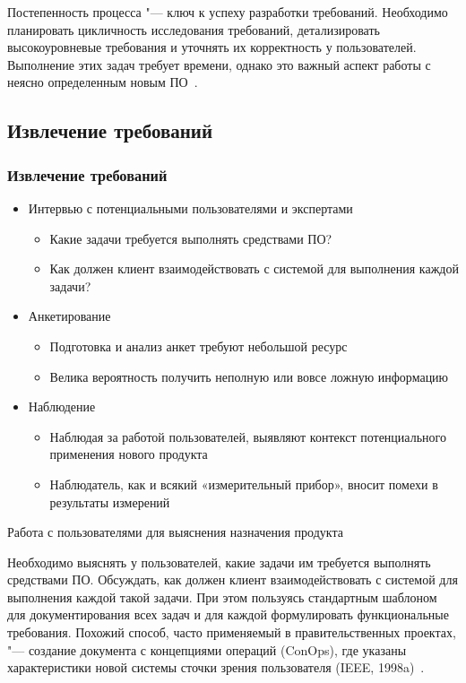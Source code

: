 \documentclass{../industrial-development}
\begin{document}
Постепенность процесса "--- ключ к успеху разработки требований. Необходимо планировать цикличность исследования требований, детализировать высокоуровневые требования и уточнять их корректность у пользователей. Выполнение этих задач требует времени, однако это важный аспект работы с неясно определенным новым ПО~\cite[с.~12--13]{Wiegers}.


\subsection{Извлечение требований}
\begin{frame} \frametitle{Извлечение требований}
\begin{itemize}

\item \alert{Интервью с потенциальными пользователями и экспертами}
\begin{itemize} 
\item Какие задачи требуется выполнять средствами ПО? 
\item Как должен клиент взаимодействовать с
системой для выполнения каждой задачи? 
\end{itemize}

\item \alert{Анкетирование}
\begin{itemize} 
\item Подготовка и анализ анкет требуют небольшой ресурс
\item Велика вероятность получить неполную или вовсе ложную информацию
\end{itemize}

\item \alert{Наблюдение}
\begin{itemize} 
\item Наблюдая за работой пользователей, выявляют контекст потенциального применения нового продукта
\item Наблюдатель, как и всякий «измерительный прибор», вносит помехи в результаты измерений
\end{itemize} 

\end{itemize}
\end{frame}

\lecturenotes

\alert{Работа с пользователями для выяснения назначения продукта}

Необходимо выяснять у пользователей, какие задачи им требуется выполнять средствами ПО. Обсуждать, как должен клиент взаимодействовать с системой для выполнения каждой такой задачи. При этом пользуясь стандартным шаблоном для документирования всех задач и для каждой формулировать функциональные требования. Похожий способ, часто применяемый в правительственных проектах, "--- создание документа с концепциями операций (ConOps), где указаны характеристики новой системы сточки зрения пользователя (IEEE, 1998a)~\cite[с.~46]{Wiegers}.
\end{document}
